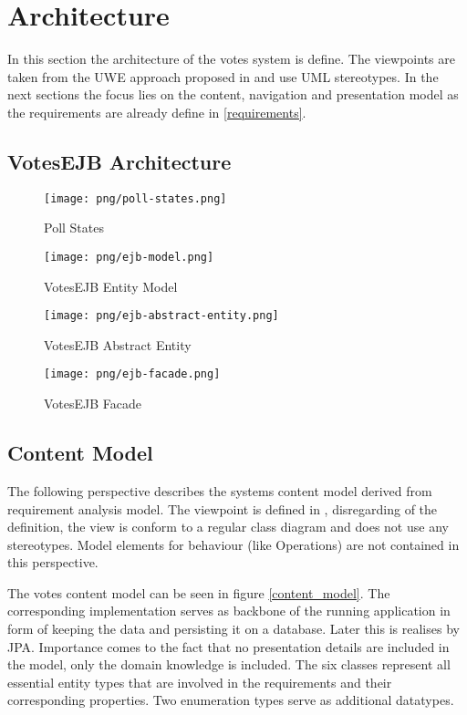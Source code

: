 \section{Architecture}

In this section the architecture of the votes system is define. 
The viewpoints are taken from the UWE approach proposed in \cite{Uwe08,uweref} and use UML stereotypes. 
In the next sections the focus lies on the content, navigation and presentation model as the requirements are already define in \ref{requirements}.

\subsection{VotesEJB Architecture}
\begin{figure}
\centering
\texttt{[image: png/poll-states.png]}
\caption{Poll States}
\label{figure:poll-states}
\end{figure}
\begin{figure}
\centering
\texttt{[image: png/ejb-model.png]}
\caption{VotesEJB Entity Model}
\label{figure:ejb-model}
\end{figure}
\begin{figure}
\centering
\texttt{[image: png/ejb-abstract-entity.png]}
\caption{VotesEJB Abstract Entity}
\label{figure:ejb-abstract-entity}
\end{figure}
\begin{figure}
\centering
\texttt{[image: png/ejb-facade.png]}
\caption{VotesEJB Facade}
\label{figure:ejb-facade}
\end{figure}


\subsection{Content Model}
The following perspective describes the systems content model derived from requirement analysis model. The viewpoint is defined in \cite{Uwe08,uweref}, disregarding of the definition, the view is conform to a regular class diagram and does not use any stereotypes. Model elements for behaviour (like Operations) are not contained in this perspective.

The votes content model can be seen in figure \ref{content_model}. The corresponding implementation serves as backbone of the running application in form of keeping the data and persisting it on a database. Later this is realises by JPA. Importance comes to the fact that no presentation details are included in the model, only the domain knowledge is included. The six classes represent all essential entity types that are involved in the requirements and their corresponding properties. Two enumeration types serve as additional datatypes. 

